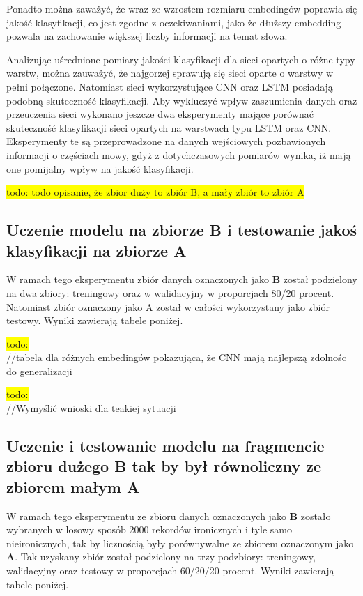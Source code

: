 Ponadto można zaważyć, że wraz ze wzrostem rozmiaru embedingów poprawia się jakość klasyfikacji, co jest zgodne z oczekiwaniami, jako że dłuższy embedding pozwala na zachowanie większej liczby informacji na temat słowa. 


Analizując uśrednione pomiary jakości klasyfikacji dla sieci opartych o różne typy warstw, można zauważyć, że najgorzej sprawują się sieci oparte o warstwy w pełni połączone. Natomiast sieci wykorzystujące CNN oraz LSTM posiadają podobną skuteczność klasyfikacji. Aby wykluczyć wpływ zaszumienia danych oraz przeuczenia sieci wykonano jeszcze dwa eksperymenty mające porównać skuteczność klasyfikacji sieci opartych na warstwach typu LSTM oraz CNN. Eksperymenty te są przeprowadzone na danych wejściowych pozbawionych informacji o częściach mowy, gdyż z dotychczasowych pomiarów wynika, iż mają one pomijalny wpływ na jakość klasyfikacji. 

\colorbox{yellow}{todo: todo opisanie, że zbior duży to zbiór B, a mały zbiór to zbiór A}\\ 
\subsection{Uczenie modelu na zbiorze B i testowanie jakoś klasyfikacji na zbiorze A }

W ramach tego eksperymentu zbiór danych oznaczonych jako \textbf{B} został podzielony na dwa zbiory: treningowy oraz w walidacyjny w proporcjach 80/20 procent. Natomiast zbiór oznaczony jako A został w całości wykorzystany jako zbiór testowy. Wyniki zawierają tabele poniżej. 

\colorbox{yellow}{todo:}\\
//tabela dla różnych embedingów pokazująca, że CNN mają najlepszą zdolnośc do generalizacji 

\colorbox{yellow}{todo:}\\ 
//Wymyślić wnioski dla teakiej sytuacji 


\subsection{Uczenie i testowanie modelu na fragmencie zbioru dużego B tak by był równoliczny ze zbiorem małym A}

W ramach tego eksperymentu ze zbioru danych oznaczonych jako \textbf{B} zostało wybranych w losowy sposób 2000 rekordów ironicznych i tyle samo nieironicznych, tak by licznością były porównywalne ze zbiorem oznaczonym jako \textbf{A}. Tak uzyskany zbiór został podzielony na trzy podzbiory: treningowy, walidacyjny oraz testowy w proporcjach 60/20/20 procent. Wyniki zawierają tabele poniżej. 

